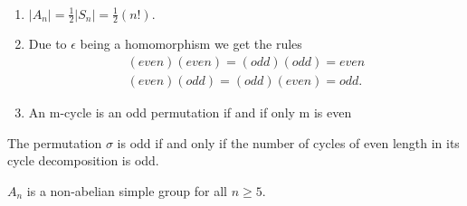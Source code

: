 \documentclass[../main]{subfiles}
\begin{document}
  \begin{nt}
  ~\begin{enumerate}
   \item $|A_n| = \frac{1}{2} |S_n| = \frac{1}{2} (n!)$.
   \item Due to $\epsilon$ being a homomorphism we get the rules 
   \begin{align*}
   (even)(even) = (odd)(odd) = even \\
   (even)(odd) = (odd)(even) = odd.
   \end{align*}
   \item An m-cycle is an odd permutation if and if only m is even
  \end{enumerate}
  \end{nt}
  
  
  \begin{prop}
   The permutation $\sigma$ is odd if and only if the number of cycles of even length in its cycle decomposition is odd. 
  \end{prop}
  
  
  \begin{nt}
   $A_n$ is a non-abelian simple group for all $n \geq 5$.
  \end{nt}
  
  
\end{document}
